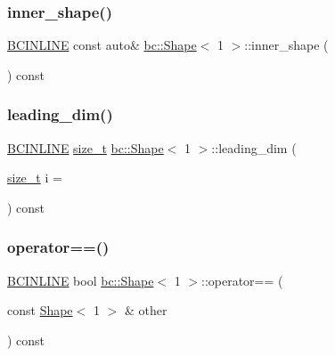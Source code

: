 \mbox{\label{structbc_1_1Shape_3_011_01_4_af0fd4494bd44cd71d8d57021e9beb0cd}} 
\subsubsection{\texorpdfstring{inner\+\_\+shape()}{inner\_shape()}}
{\footnotesize\ttfamily \hyperlink{common_8h_a6699e8b0449da5c0fafb878e59c1d4b1}{B\+C\+I\+N\+L\+I\+NE} const auto\& \hyperlink{structbc_1_1Shape}{bc\+::\+Shape}$<$ 1 $>$\+::inner\+\_\+shape (\begin{DoxyParamCaption}{ }\end{DoxyParamCaption}) const\hspace{0.3cm}{\ttfamily [inline]}}

\mbox{\label{structbc_1_1Shape_3_011_01_4_a9b8a715dae0f3a5ae4d57903978d199f}} 
\subsubsection{\texorpdfstring{leading\+\_\+dim()}{leading\_dim()}}
{\footnotesize\ttfamily \hyperlink{common_8h_a6699e8b0449da5c0fafb878e59c1d4b1}{B\+C\+I\+N\+L\+I\+NE} \hyperlink{structbc_1_1Shape_3_011_01_4_a7ab1c3926651c49d726655dbaa5dc0a3}{size\+\_\+t} \hyperlink{structbc_1_1Shape}{bc\+::\+Shape}$<$ 1 $>$\+::leading\+\_\+dim (\begin{DoxyParamCaption}\item[{\hyperlink{structbc_1_1Shape_3_011_01_4_a7ab1c3926651c49d726655dbaa5dc0a3}{size\+\_\+t}}]{i = {} }\end{DoxyParamCaption}) const\hspace{0.3cm}{\ttfamily [inline]}}

\mbox{\label{structbc_1_1Shape_3_011_01_4_a26eedf0c4688dd2bdc254ddae87850af}} 
\subsubsection{\texorpdfstring{operator==()}{operator==()}}
{\footnotesize\ttfamily \hyperlink{common_8h_a6699e8b0449da5c0fafb878e59c1d4b1}{B\+C\+I\+N\+L\+I\+NE} bool \hyperlink{structbc_1_1Shape}{bc\+::\+Shape}$<$ 1 $>$\+::operator== (\begin{DoxyParamCaption}\item[{const \hyperlink{structbc_1_1Shape}{Shape}$<$ 1 $>$ \&}]{other }\end{DoxyParamCaption}) const\hspace{0.3cm}{\ttfamily [inline]}}

